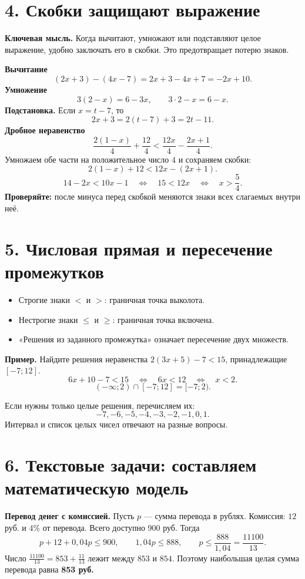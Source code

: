 \documentclass[a4paper,12pt]{article}
\newcommand{\keyidea}[1]{\textcolor{accent}{\textbf{#1}}}
\newcommand{\lessonsection}[1]{\section*{#1}}
\begin{document}
\lessonsection{4. Скобки защищают выражение}
\keyidea{Ключевая мысль.} Когда вычитают, умножают или подставляют целое выражение, удобно заключать его в скобки. Это предотвращает потерю знаков.

\textbf{Вычитание}
\[(2x+3)-(4x-7)=2x+3-4x+7=-2x+10.\]
\textbf{Умножение}
\[3(2-x)=6-3x,\qquad 3\cdot2-x=6-x.\]
\textbf{Подстановка.} Если $x=t-7$, то
\[2x+3=2(t-7)+3=2t-11.\]
\textbf{Дробное неравенство}
\[\frac{2(1-x)}{4}+\frac{12}{4}<\frac{12x}{4}-\frac{2x+1}{4}.\]
Умножаем обе части на положительное число $4$ и сохраняем скобки:
\[2(1-x)+12<12x-(2x+1).\]
\[14-2x<10x-1\quad\Longleftrightarrow\quad15<12x\quad\Longleftrightarrow\quad x>\frac54.\]
\textbf{Проверяйте:} после минуса перед скобкой меняются знаки всех слагаемых внутри неё.

\lessonsection{5. Числовая прямая и пересечение промежутков}
\begin{itemize}
\item Строгие знаки $<$ и $>$: граничная точка выколота.
\item Нестрогие знаки $\le$ и $\ge$: граничная точка включена.
\item «Решения из заданного промежутка» означает пересечение двух множеств.
\end{itemize}

\textbf{Пример.} Найдите решения неравенства $2(3x+5)-7<15$, принадлежащие $[-7;12]$.
\[6x+10-7<15\quad\Longleftrightarrow\quad6x<12\quad\Longleftrightarrow\quad x<2.\]
\[( -\infty;2)\cap[-7;12]=[-7;2).\]
\begin{center}
\end{center}
Если нужны только целые решения, перечисляем их:
\[-7,-6,-5,-4,-3,-2,-1,0,1.\]
Интервал и список целых чисел отвечают на разные вопросы.

\lessonsection{6. Текстовые задачи: составляем математическую модель}
\textbf{Перевод денег с комиссией.} Пусть $p$ --- сумма перевода в рублях. Комиссия: $12$ руб. и $4\%$ от перевода. Всего доступно $900$ руб. Тогда
\[p+12+0{,}04p\le900,\qquad 1{,}04p\le888,\qquad p\le\frac{888}{1{,}04}=\frac{11100}{13}.\]
Число $\frac{11100}{13}=853+\frac{11}{13}$ лежит между $853$ и $854$. Поэтому наибольшая целая сумма перевода равна \textbf{853 руб.}
\end{document}
